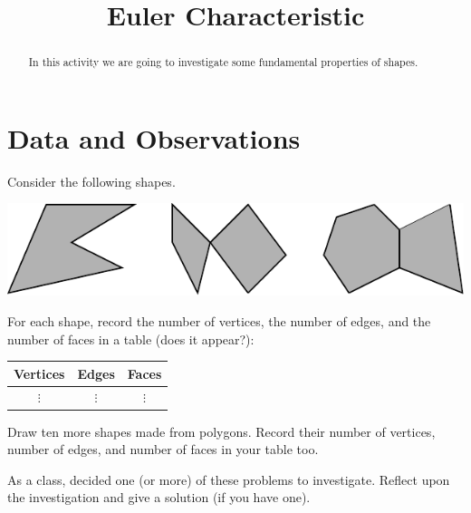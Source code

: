\documentclass{ximera}
\title{Euler Characteristic}
\begin{document}
\begin{abstract}
In this activity we are going to investigate some fundamental
properties of shapes.
\end{abstract}
\maketitle

\section{Data and Observations}


\begin{question}
Consider the following shapes.
\begin{image}
\includegraphics{eulerCharPoly}
\end{image}
For each shape, record the number of vertices, the number of edges,
and the number of faces in a table (does it appear?):
\begin{center}
\begin{tabular}{c|c|c}
Vertices & Edges & Faces\\
\hline\hline
 $\vdots$  & $\vdots$  & $\vdots$  \\ 
\end{tabular}
\end{center}
\begin{freeResponse}
\end{freeResponse}
\end{question}

\newpage

\begin{question}
Draw ten more shapes made from polygons. Record their number of
vertices, number of edges, and number of faces in your table too.
\begin{freeResponse}
\end{freeResponse}
\end{question}


\begin{problem}
As a class, decided one (or more) of these problems to
investigate. Reflect upon the investigation and give a solution (if
you have one).
\begin{freeResponse}
\end{freeResponse}
\end{problem}
\end{document}
